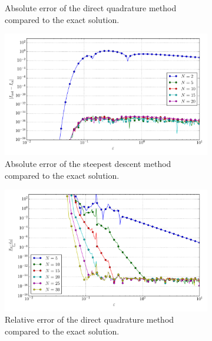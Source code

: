\documentclass[a4paper,10pt]{article}
\begin{document}
\begin{figure}[ht!]
\begin{subfigure}[t]{0.5\linewidth}
    \caption{Absolute error of the direct quadrature method compared to the exact solution.}
    \label{fig:tp_2d_conv_eps_23_22_err_qr}
  \end{subfigure}
  \begin{subfigure}[t]{0.5\linewidth}
    \includegraphics[width=\linewidth]{./plots/tp_2d_conv_eps_(2,3)_(2,2)_err_nsd.pdf}
    \caption{Absolute error of the steepest descent method compared to the exact solution.}
    \label{fig:tp_2d_conv_eps_23_22_err_nsd}
  \end{subfigure}
  \begin{subfigure}[t]{0.5\linewidth}
    \includegraphics[width=\linewidth]{./plots/tp_2d_conv_eps_(2,3)_(2,2)_err_rel_qr.pdf}
    \caption{Relative error of the direct quadrature method compared to the exact solution.}
    \label{fig:tp_2d_conv_eps_23_22_err_qr}
  \end{subfigure}
  \begin{subfigure}[t]{0.5\linewidth}

\end{subfigure}
\end{figure}
\end{document}
